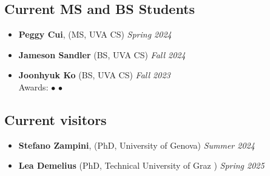 \subsection*{Current MS and BS Students}
\begin{itemize}
  \item \textbf{Peggy Cui}, ({\sc MS, UVA} CS)  \hfill{\em Spring 2024}
  \item  \textbf{Jameson Sandler} ({\sc BS, UVA} CS)  \hfill{\em Fall 2024}
  \item  \textbf{Joonhyuk Ko} ({\sc BS, UVA} CS)  \hfill{\em Fall 2023}\\
  {\sc Awards:} 
    $\bullet$  
    $\bullet$ 
\end{itemize}

\subsection*{Current visitors}
\begin{itemize}
  \item \textbf{Stefano Zampini}, ({\sc PhD, University of Genova})  \hfill{\em Summer 2024}
  \item  \textbf{Lea Demelius} ({\sc PhD, Technical University of Graz })  \hfill{\em Spring 2025}
\end{itemize}


